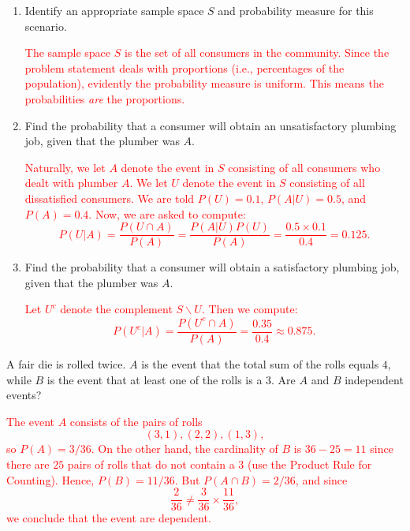 \documentclass[12pt,reqno]{amsart}
\begin{document}
\medskip
\begin{enumerate}
    \item Identify an appropriate sample space $S$ and probability measure for this scenario.
    
    \bigskip
    \textcolor{red}{The sample space $S$ is the set of all consumers in the community. Since the problem statement deals with proportions (i.e., percentages of the population), evidently the probability measure is uniform. This means the probabilities \textit{are} the proportions.}
    \bigskip

    \item Find the probability that a consumer will obtain an unsatisfactory plumbing job, given that the plumber was $A$.
    
    \bigskip
    \textcolor{red}{Naturally, we let $A$ denote the event in $S$ consisting of all consumers who dealt with plumber $A$. We let $U$ denote the event in $S$ consisting of all dissatisfied consumers. We are told $P(U)=0.1$, $P(A| U) = 0.5$, and $P(A)=0.4$. Now, we are asked to compute:
        \[P(U|A) = \frac{P(U\cap A)}{P(A)} = \frac{P(A|U)P(U)}{P(A)} = \frac{0.5 \times 0.1}{0.4} = 0.125. \]}
    \bigskip

    \item Find the probability that a consumer will obtain a satisfactory plumbing job, given that the plumber was $A$.
    
    \bigskip
    \textcolor{red}{Let $U^c$ denote the complement $S\smallsetminus U$. Then we compute:
        \[P(U^c | A) = \frac{P(U^c \cap A)}{P(A)} = \frac{0.35}{0.4} \approx 0.875.\]}
\end{enumerate}














\bigskip
\prob A fair die is rolled twice. $A$ is the event that the total sum of the rolls equals $4$, while $B$ is the event that at least one of the rolls is a 3. Are $A$ and $B$ independent events?

\bigskip
\textcolor{red}{The event $A$ consists of the pairs of rolls
    \[(3,1),(2,2),(1,3),\]
so $P(A) = 3/36$. On the other hand, the cardinality of $B$ is $36-25 = 11$ since there are $25$ pairs of rolls that do not contain a $3$ (use the Product Rule for Counting). Hence, $P(B) = 11/36$. But $P(A\cap B) = 2/36$, and since
    \[\frac{2}{36} \neq \frac{3}{36} \times \frac{11}{36},\]
we conclude that the event are dependent.}
\bigskip
\end{document}
